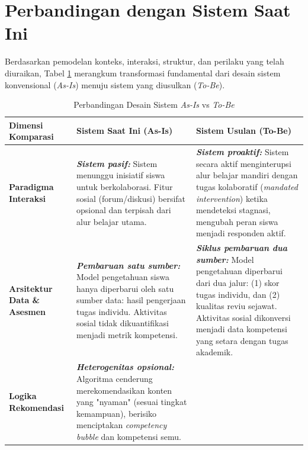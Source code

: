 \section{Perbandingan dengan Sistem Saat Ini}
\label{sec:perbandingan}

Berdasarkan pemodelan konteks, interaksi, struktur, dan perilaku yang telah diuraikan, Tabel \ref{tbl:perbandingan_sistem} merangkum transformasi fundamental dari desain sistem konvensional (\textit{As-Is}) menuju sistem yang diusulkan (\textit{To-Be}).

\begin{table}[!ht]
    \centering
    \caption{Perbandingan Desain Sistem \textit{As-Is} vs \textit{To-Be}}
    \label{tbl:perbandingan_sistem}
    \begin{tabular}{|p{}|p{}|p{}|}
        \hline
        \textbf{Dimensi Komparasi} & \textbf{Sistem Saat Ini (As-Is)} & \textbf{Sistem Usulan (To-Be)} \\
        \hline
        \textbf{Paradigma Interaksi} & 
        \textbf{\textit{Sistem pasif:}} \newline
        Sistem menunggu inisiatif siswa untuk berkolaborasi. Fitur sosial (forum/diskusi) bersifat opsional dan terpisah dari alur belajar utama. & 
        \textbf{\textit{Sistem proaktif:}} \newline
        Sistem secara aktif menginterupsi alur belajar mandiri dengan tugas kolaboratif (\textit{mandated intervention}) ketika mendeteksi stagnasi, mengubah peran siswa menjadi responden aktif. \\
        \hline
        \textbf{Arsitektur Data \& Asesmen} & 
        \textbf{\textit{Pembaruan satu sumber:}} \newline
        Model pengetahuan siswa hanya diperbarui oleh satu sumber data: hasil pengerjaan tugas individu. Aktivitas sosial tidak dikuantifikasi menjadi metrik kompetensi. & 
        \textbf{\textit{Siklus pembaruan dua sumber:}} \newline
        Model pengetahuan diperbarui dari dua jalur: (1) skor tugas individu, dan (2) kualitas reviu sejawat. Aktivitas sosial dikonversi menjadi data kompetensi yang setara dengan tugas akademik. \\
        \hline
        \textbf{Logika Rekomendasi} & 
        \textbf{\textit{Heterogenitas opsional:}} \newline
        Algoritma cenderung merekomendasikan konten yang "nyaman" (sesuai tingkat kemampuan), berisiko menciptakan \textit{competency bubble} dan kompetensi semu. & 

\end{tabular}
\end{table}
